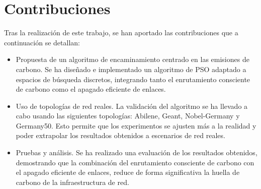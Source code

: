 \section{Contribuciones}

Tras la realización de este trabajo, se han aportado las contribuciones que a continuación se detallan:

\begin{itemize}
    \item Propuesta de un algoritmo de encaminamiento centrado en las emisiones de carbono. Se ha diseñado e implementado un algoritmo de PSO adaptado a espacios de búsqueda discretos, integrando tanto el enrutamiento consciente de carbono como el apagado eficiente de enlaces.
    \item Uso de topologías de red reales. La validación del algoritmo se ha llevado a cabo usando las siguientes topologías: Abilene, Geant, Nobel-Germany y Germany50. Esto permite que los experimentos se ajusten más a la realidad y poder extrapolar los resultados obtenidos a escenarios de red reales.
    \item Pruebas y análisis. Se ha realizado una evaluación de los resultados obtenidos, demostrando que la combinación del enrutamiento consciente de carbono con el apagado eficiente de enlaces, reduce de forma significativa la huella de carbono de la infraestructura de red.
\end{itemize}